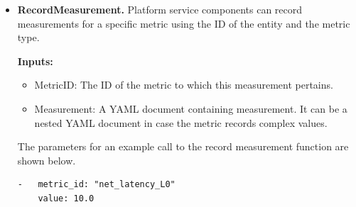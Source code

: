 \begin{itemize}
\item \textbf{RecordMeasurement.} Platform service components can record measurements for a specific metric  using the ID of the entity and the metric type. 
\par \noindent \textbf{Inputs:}
\begin{itemize}
\item MetricID: The ID of the metric to which this measurement pertains.
\item Measurement: A YAML document containing measurement. It can be a nested YAML document in case the metric records complex values.
\end{itemize}
\par The parameters for an example call to the record measurement function are shown below.
\begin{verbatim}
-   metric_id: "net_latency_L0"
    value: 10.0
\end{verbatim}




\end{itemize}
